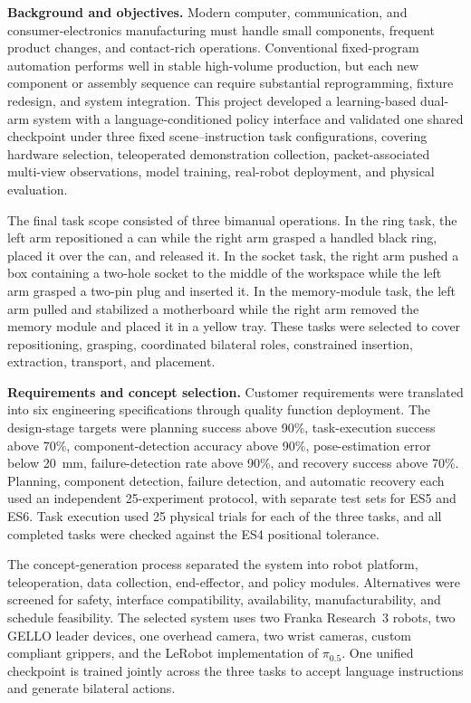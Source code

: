 
\begin{digest}

\noindent\textbf{Background and objectives.}
Modern computer, communication, and consumer-electronics manufacturing must handle small components, frequent product changes, and contact-rich operations. Conventional fixed-program automation performs well in stable high-volume production, but each new component or assembly sequence can require substantial reprogramming, fixture redesign, and system integration. This project developed a learning-based dual-arm system with a language-conditioned policy interface and validated one shared checkpoint under three fixed scene--instruction task configurations, covering hardware selection, teleoperated demonstration collection, packet-associated multi-view observations, model training, real-robot deployment, and physical evaluation.

The final task scope consisted of three bimanual operations. In the ring task, the left arm repositioned a can while the right arm grasped a handled black ring, placed it over the can, and released it. In the socket task, the right arm pushed a box containing a two-hole socket to the middle of the workspace while the left arm grasped a two-pin plug and inserted it. In the memory-module task, the left arm pulled and stabilized a motherboard while the right arm removed the memory module and placed it in a yellow tray. These tasks were selected to cover repositioning, grasping, coordinated bilateral roles, constrained insertion, extraction, transport, and placement.

\noindent\textbf{Requirements and concept selection.}
Customer requirements were translated into six engineering specifications through quality function deployment. The design-stage targets were planning success above 90\%, task-execution success above 70\%, component-detection accuracy above 90\%, pose-estimation error below 20~mm, failure-detection rate above 90\%, and recovery success above 70\%. Planning, component detection, failure detection, and automatic recovery each used an independent 25-experiment protocol, with separate test sets for ES5 and ES6. Task execution used 25 physical trials for each of the three tasks, and all completed tasks were checked against the ES4 positional tolerance.

The concept-generation process separated the system into robot platform, teleoperation, data collection, end-effector, and policy modules. Alternatives were screened for safety, interface compatibility, availability, manufacturability, and schedule feasibility. The selected system uses two Franka Research~3 robots, two GELLO leader devices, one overhead camera, two wrist cameras, custom compliant grippers, and the LeRobot implementation of $\pi_{0.5}$. One unified checkpoint is trained jointly across the three tasks to accept language instructions and generate bilateral actions.


\end{digest}
